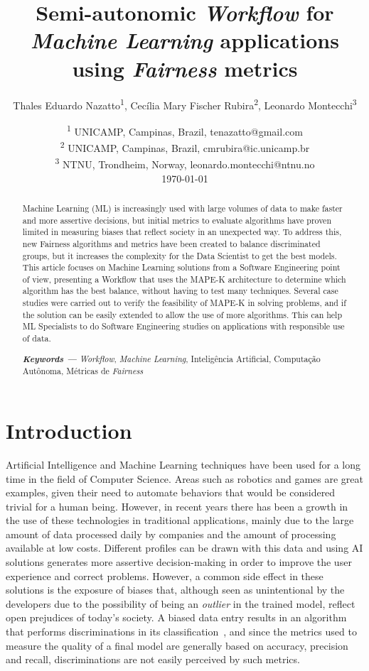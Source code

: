 \documentclass[runningheads]{llncs}
\title{Semi-autonomic \textit{Workflow} for \textit{Machine Learning} applications using \textit{Fairness} metrics}
\author{Thales Eduardo Nazatto\textsuperscript{1}, Cecília Mary Fischer Rubira\textsuperscript{2}, Leonardo Montecchi\textsuperscript{3}}
\date{
	\textsuperscript{1} UNICAMP, Campinas, Brazil, tenazatto@gmail.com
	\\
	\textsuperscript{2} UNICAMP, Campinas, Brazil, cmrubira@ic.unicamp.br
	\\
	\textsuperscript{3} NTNU, Trondheim, Norway, leonardo.montecchi@ntnu.no\\[2ex]
	\today
}
\institute{
	\textsuperscript{1} UNICAMP, Campinas, Brazil, tenazatto@gmail.com
	\\
	\textsuperscript{2} UNICAMP, Campinas, Brazil, cmrubira@ic.unicamp.br
	\\
	\textsuperscript{3} NTNU, Trondheim, Norway, leonardo.montecchi@ntnu.no\\[2ex]
}
\providecommand{\keywords}[1]
{
  \small	
  \textbf{\textit{Keywords ---}} #1
}
\begin{document}
\maketitle

\begin{abstract}
Machine Learning (ML) is increasingly used with large volumes of data to make faster and more assertive decisions, but initial metrics to evaluate algorithms have proven limited in measuring biases that reflect society in an unexpected way. To address this, new Fairness algorithms and metrics have been created to balance discriminated groups, but it increases the complexity for the Data Scientist to get the best models. This article focuses on Machine Learning solutions from a Software Engineering point of view, presenting a Workflow that uses the MAPE-K architecture to determine which algorithm has the best balance, without having to test many techniques. Several case studies were carried out to verify the feasibility of MAPE-K in solving problems, and if the solution can be easily extended to allow the use of more algorithms. This can help ML Specialists to do Software Engineering studies on applications with responsible use of data.

\keywords{\textit{Workflow}, \textit{Machine Learning}, Inteligência Artificial, Computação Autônoma, Métricas de \textit{Fairness}}
\end{abstract}

\section{Introduction}

Artificial Intelligence and Machine Learning techniques have been used for a long time in the field of Computer Science. Areas such as robotics and games are great examples, given their need to automate behaviors that would be considered trivial for a human being. However, in recent years there has been a growth in the use of these technologies in traditional applications, mainly due to the large amount of data processed daily by companies and the amount of processing available at low costs. Different profiles can be drawn with this data and using AI solutions generates more assertive decision-making in order to improve the user experience and correct problems. However, a common side effect in these solutions is the exposure of biases that, although seen as unintentional by the developers due to the possibility of being an \textit{outlier} in the trained model, reflect open prejudices of today's society. A biased data entry results in an algorithm that performs discriminations in its classification~\citep{Buolamwini_2018}, and since the metrics used to measure the quality of a final model are generally based on accuracy, precision and recall, discriminations are not easily perceived by such metrics.
\end{document}
